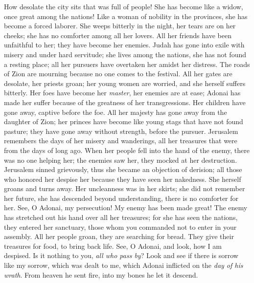 
\begin{biblechapter} %
 How desolate the city sits 
that was full of people! 
She has become like a widow, 
once great among the nations! 
Like a woman of nobility in the provinces, 
she has become a forced laborer.
\verse She weeps bitterly in the night, 
her tears are on her cheeks; 
she has no comforter 
among all her lovers. 
All her friends have been unfaithful to her; 
they have become her enemies.
\verse Judah has gone into exile with misery 
and under hard servitude; 
she lives among the nations, 
she has not found a resting place; 
all her pursuers have overtaken her 
amidst her distress.
\verse The roads of Zion are mourning 
because no one comes to the festival. 
All her gates are desolate, 
her priests groan; 
her young women are worried, 
and she herself suffers bitterly.
\verse Her foes have become her \textit{master}, 
her enemies are at ease; 
Adonai has made her suffer 
because of the greatness of her transgressions. 
Her children have gone away, 
captive before the foe.
\verse All her majesty has gone away 
from the daughter of Zion; 
her princes have become like young stags 
that have not found pasture; 
they have gone away without strength, 
before the pursuer.
\verse Jerusalem remembers 
the days of her misery and wanderings, 
all her treasures 
that were from the days of long ago. 
When her people fell into the hand of the enemy, 
there was no one helping her; 
the enemies saw her, they mocked 
at her destruction.
\verse Jerusalem sinned grievously, 
thus she became an objection of derision; 
all those who honored her despise her 
because they have seen her nakedness. 
She herself groans 
and turns away.
\verse Her uncleanness was in her skirts; 
she did not remember her future, 
she has descended beyond understanding, 
there is no comforter for her. 
See, O Adonai, my persecution! 
My enemy has been made great!
\verse The enemy has stretched out his hand 
over all her treasures; 
for she has seen the nations, 
they entered her sanctuary, 
those whom you commanded not to enter 
in your assembly.
\verse All her people groan, 
they are searching for bread. 
They give their treasures for food, 
to bring back life. 
See, O Adonai, and look, 
how I am despised.
\verse Is it nothing to you, \textit{all who pass by}? 
Look and see 
if there is sorrow like my sorrow, 
which was dealt to me, 
which Adonai inflicted 
on the \textit{day of his wrath}.
\verse From heaven he sent fire, 
into my bones he let it descend. 

\end{biblechapter}
